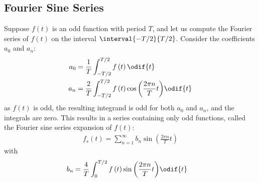 \documentclass{article}
\begin{document}
\subsection{Fourier Sine Series}
Suppose \(f\left( t \right)\) is an odd function with period \(T\), and
let us compute the Fourier series of \(f\left( t \right)\) on the
interval \(\interval{-T/2}{T/2}\). Consider the coefficients \(a_0\)
and \(a_n\):
\begin{align*}
    a_0 & = \frac{1}{T} \int_{-T/2}^{T/2} f\left( t \right) \odif{t}                                         \\
    a_n & = \frac{2}{T} \int_{-T/2}^{T/2} f\left( t \right) \cos{\left( \frac{2\pi n}{T} t \right)} \odif{t}
\end{align*}
as \(f\left( t \right)\) is odd, the resulting integrand is odd for
both \(a_0\) and \(a_n\), and the integrals are zero. This results in a
series containing only odd functions, called the Fourier sine series
expansion of \(f\left( t \right)\):
\begin{align*}
    f_s\left( t \right) = \sum_{n=1}^{\infty} b_n \sin{\left( \frac{2\pi n}{T} t \right)}
\end{align*}
with
\begin{align*}
    b_n & = \frac{4}{T} \int_{0}^{T/2} f\left( t \right) \sin{\left( \frac{2\pi n}{T} t \right)} \odif{t}
\end{align*}
\end{document}
